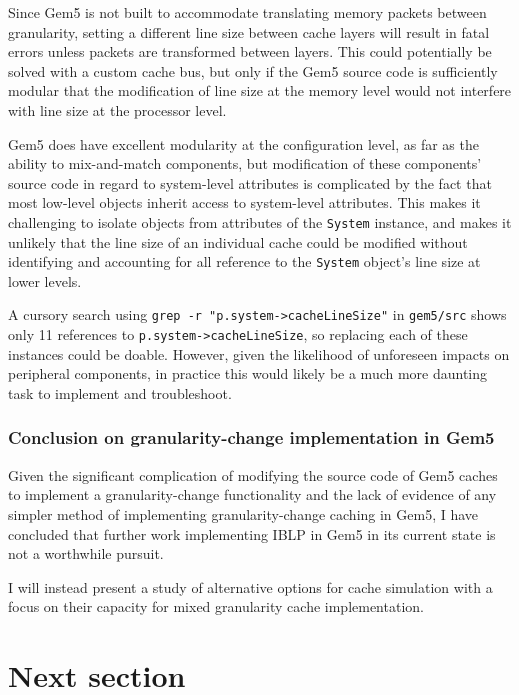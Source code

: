 \documentclass[12pt,twoside]{reedthesis}
\begin{document}
	Since Gem5 is not built to accommodate translating memory packets between granularity, setting a different line size between cache layers will result in fatal errors unless packets are transformed between layers. This could potentially be solved with a custom cache bus, but only if the Gem5 source code is sufficiently modular that the modification of line size at the memory level would not interfere with line size at the processor level.
	
	Gem5 does have excellent modularity at the configuration level, as far as the ability to mix-and-match components, but modification of these components' source code in regard to system-level attributes is complicated by the fact that most low-level objects inherit access to system-level attributes. This makes it challenging to isolate objects from attributes of the \verb`System` instance, and makes it unlikely that the line size of an individual cache could be modified without identifying and accounting for all reference to the \verb`System` object's line size at lower levels.

	A cursory search using \verb`grep -r "p.system->cacheLineSize"` in \verb`gem5/src` shows only 11 references to \verb`p.system->cacheLineSize`, so replacing each of these instances could be doable. However, given the likelihood of unforeseen impacts on peripheral components, in practice this would likely be a much more daunting task to implement and troubleshoot.

	\subsection*{Conclusion on granularity-change implementation in Gem5}

	Given the significant complication of modifying the source code of Gem5 caches to implement a granularity-change functionality and the lack of evidence of any simpler method of implementing granularity-change caching in Gem5, I have concluded that further work implementing IBLP in Gem5 in its current state is not a worthwhile pursuit.

	I will instead present a study of alternative options for cache simulation with a focus on their capacity for mixed granularity cache implementation.


\chapter{Next section}
\end{document}
